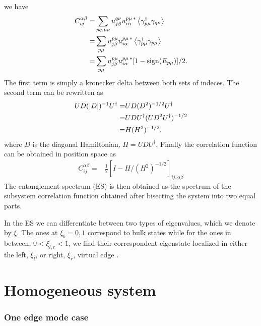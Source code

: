 \documentclass[twocolumn,amsmath,longbibliography,amssymb,superscriptaddress]{revtex4-1}
\begin{document}
we have
\begin{align*}
C_{ij}^{\alpha \beta} =& \sum_{pq,\mu\nu} u^{q\nu }_{j\beta} u^{p\mu \, \ast}_{i\alpha} \expval{\gamma^\dagger_{p\mu} \gamma_{q\nu} } \\
=&  \sum_{p\mu} u^{p\mu }_{j\beta} u^{p\mu \, \ast}_{i\alpha} \expval{\gamma^\dagger_{p\mu} \gamma_{p\mu} } \\
=&  \sum_{p\mu} u^{p\mu }_{j\beta} u^{p\mu \, \ast}_{i\alpha} [1-{\rm sign}(E_{p\mu})]/2.
\end{align*}
The first term is simply a kronecker delta between both sets of indeces. The second term can be rewritten as
\begin{align*}
UD(\abs{D})^{-1}U^\dagger =& UD(D^2)^{-1/2}U^\dagger \\
=& U D U^\dagger (U D^2 U^\dagger)^{-1/2} \\
=& H(H^2)^{-1/2},
\end{align*}
where $D$ is the diagonal Hamiltonian, $H=UDU^\dagger$. Finally the correlation function can be obtained in position space as
\begin{align*}
C_{ij}^{\alpha \beta} =& \frac{1}{2}\left[I - H/ (H^2)^{-1/2} \right]_{ij, \alpha \beta}
\end{align*}
The entanglement spectrum (ES) is then obtained as the spectrum of the subsystem correlation function obtained after bisecting the system into two equal parts. 

In the ES we can differentiate between two types of eigenvalues, which we denote by $\xi$. The ones at $\xi_b = 0,1$ correspond to bulk states while for the ones in between, $0<\xi_{l,r}<1$, we find their correspondent eigenstate localized in either the left, $\xi_l$, or right, $\xi_r$, virtual edge \cite{Peschel2008}. 

\section{Homogeneous system}

\subsubsection{One edge mode case}
\end{document}
